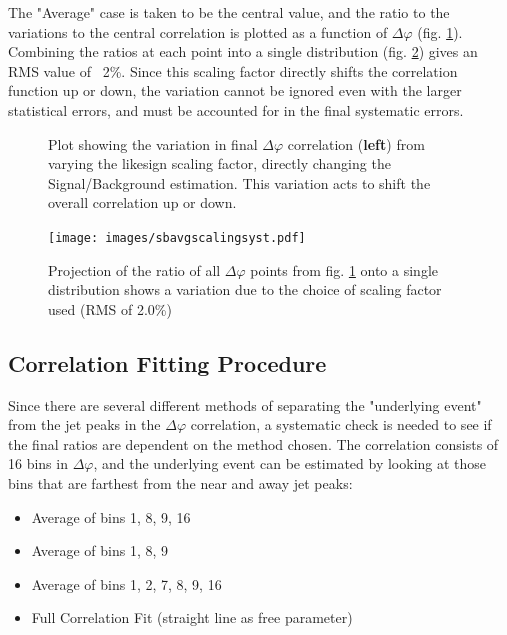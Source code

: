 \documentclass[ALICE,manyauthors]{ALICE_analysis_notes}
\begin{document}
The "Average" case is taken to be the central value, and the ratio to the variations to the central correlation is plotted as a function of $\Delta\varphi$ (fig. \ref{scalingcheck}). Combining the ratios at each point into a single distribution (fig. \ref{scalingRMS}) gives an RMS value of ~2\%.  Since this scaling factor directly shifts the correlation function up or down, the variation cannot be ignored even with the larger statistical errors, and must be accounted for in the final systematic errors.

\begin{figure}[ht]
\centering
\begin{subfigure}{
\texttt{[image: images/sbscalingdphi.pdf]}}
\end{subfigure}
\begin{subfigure}{
\texttt{[image: images/sbavgscalingratios.pdf]}}
\end{subfigure}
\caption{Plot showing the variation in final $\Delta\varphi$ correlation (\textbf{left}) from varying the likesign scaling factor, directly changing the Signal/Background estimation.  This variation acts to shift the overall correlation up or down.}
\label{scalingcheck}
\end{figure}

\begin{figure}[ht]
\centering
\texttt{[image: images/sbavgscalingsyst.pdf]}
\caption{Projection of the ratio of all $\Delta\varphi$ points from fig. \ref{scalingcheck} onto a single distribution shows a variation due to the choice of scaling factor used (RMS of 2.0\%)}
\label{scalingRMS}
\end{figure}

\subsection{Correlation Fitting Procedure}
\label{corrfitproc}
Since there are several different methods of separating the "underlying event" from the jet peaks in the $\Delta\varphi$ correlation, a systematic check is needed to see if the final ratios are dependent on the method chosen.  The correlation consists of 16 bins in $\Delta\varphi$, and the underlying event can be estimated by looking at those bins that are farthest from the near and away jet peaks:

\begin{center}
\begin{itemize}
    \item Average of bins 1, 8, 9, 16
    \item Average of bins 1, 8, 9
    \item Average of bins 1, 2, 7, 8, 9, 16
    \item Full Correlation Fit (straight line as free parameter)
\end{itemize}
\end{center}
\end{document}
